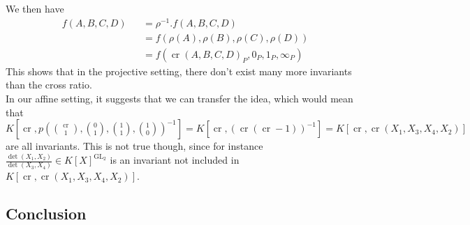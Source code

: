 We then have
\begin{equation}
  \begin{aligned}
    &f(A,B,C,D)
    &&= \rho^{-1}.f (A,B,C,D)\\
    &&&= f(\rho(A),\rho(B),\rho(C),\rho(D))\\
    &&&= f(\operatorname{cr}(A,B,C,D)_P,0_P,1_P,\infty_P)
  \end{aligned}
\end{equation}
This shows that in the projective setting, there don't exist many more invariants than the cross ratio.  \\
In our affine setting, it suggests that we can transfer the idea, which would mean that $K[\operatorname{cr},p(\binom{\operatorname{cr}}{1},\binom{0}{1},\binom{1}{1},\binom{1}{0})^{-1}] = K[\operatorname{cr},(\operatorname{cr}(\operatorname{cr}-1))^{-1}] = K[\operatorname{cr},\operatorname{cr}(X_1,X_3,X_4,X_2)]$ are all invariants.
This is not true though, since for instance \linebreak$\frac{\operatorname{det}(X_1,X_2)}{\operatorname{det}(X_3,X_4)} \in K[X]^{\operatorname{GL}_2}$ is an invariant not included in $K[\operatorname{cr},\operatorname{cr}(X_1,X_3,X_4,X_2)]$.

\subsection{Conclusion}
  
